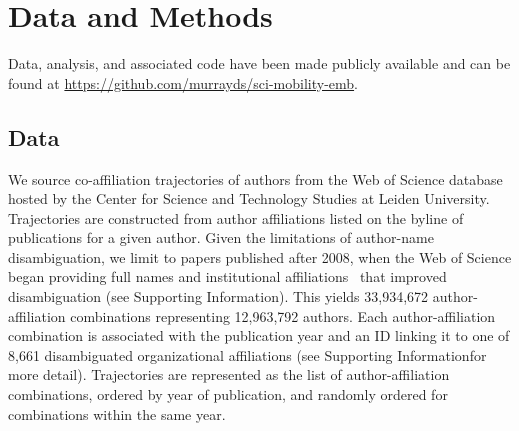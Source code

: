 \documentclass[12pt]{article} %
\def\SI{Supporting Information}
\begin{document}
%
%
\section*{Data and Methods}
\label{sec:datamethods} %

Data, analysis, and associated code have been made publicly available and can be found at \url{https://github.com/murrayds/sci-mobility-emb}.

\subsection*{Data}
We source co-affiliation trajectories of authors from the Web of Science database hosted by the Center for Science and Technology Studies at Leiden University.
Trajectories are constructed from author affiliations listed on the byline of publications for a given author.
Given the limitations of author-name disambiguation, we limit to papers published after 2008, when the Web of Science began providing full names and institutional affiliations~\autocite{caron2014disambiguation} that improved disambiguation (see \SI).
This yields 33,934,672 author-affiliation combinations representing 12,963,792 authors.
Each author-affiliation combination is associated with the publication year and an ID linking it to one of 8,661 disambiguated organizational affiliations (see \SI for more detail).
Trajectories are represented as the list of author-affiliation combinations, ordered by year of publication, and randomly ordered for combinations within the same year.
\end{document}

